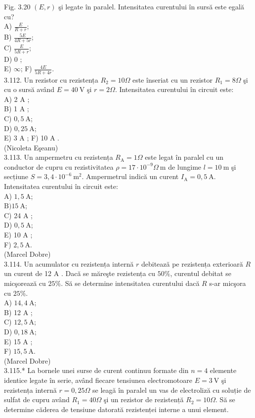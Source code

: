 \documentclass[10pt]{article}
\begin{document}
Fig. 3.20 $(E, r)$ şi legate în paralel. Intensitatea curentului în sursă este egală cu?\\
A) $\frac{E}{R+r}$;\\
B) $\frac{5 E}{4 R+5 r}$;\\
C) $\frac{E}{5 R+r}$;\\
D) 0 ;\\
E) $\infty$; F) $\frac{4 E}{5 R+4 r}$.\\
3.112. Un rezistor cu rezistența $R_{2}=10 \Omega$ este înseriat cu un rezistor $R_{1}=8 \Omega$ şi cu o sursă având $E=40 \mathrm{~V}$ şi $r=2 \Omega$. Intensitatea curentului în circuit este:\\
A) 2 A ;\\
B) 1 A ;\\
C) $0,5 \mathrm{~A}$;\\
D) $0,25 \mathrm{~A}$;\\
E) 3 A ; F) 10 A .\\
(Nicoleta Eşeanu)\\
3.113. Un ampermetru cu rezistența $R_{\mathrm{A}}=1 \Omega$ este legat în paralel cu un conductor de cupru cu rezistivitatea $\rho=17 \cdot 10^{-9} \Omega \mathrm{~m}$ de lungime $l=10 \mathrm{~m}$ şi secțiune $S=3,4 \cdot 10^{-6} \mathrm{~m}^{2}$. Ampermetrul indică un curent $I_{\mathrm{A}}=0,5 \mathrm{~A}$. Intensitatea curentului în circuit este:\\
A) $1,5 \mathrm{~A}$;\\
$\mathrm{B}) 15 \mathrm{~A}$;\\
C) 24 A ;\\
D) $0,5 \mathrm{~A}$;\\
E) 10 A ;\\
F) $2,5 \mathrm{~A}$.\\
(Marcel Dobre)\\
3.114. Un acumulator cu rezistența internă $r$ debitează pe rezistența exterioară $R$ un curent de 12 A . Dacă se măreşte rezistența cu $50 \%$, curentul debitat se micşorează cu $25 \%$. Să se determine intensitatea curentului dacă $R$ s-ar micşora cu $25 \%$.\\
A) $14,4 \mathrm{~A}$;\\
B) 12 A ;\\
C) $12,5 \mathrm{~A}$;\\
D) $0,18 \mathrm{~A}$;\\
E) 15 A ;\\
F) $15,5 \mathrm{~A}$.\\
(Marcel Dobre)\\
3.115.* La bornele unei surse de curent continuu formate din $n=4$ elemente identice legate în serie, având fiecare tensiunea electromotoare $E=3 \mathrm{~V}$ şi rezistența internă $r=0,25 \Omega$ se leagă în paralel un vas de electroliză cu soluție de sulfat de cupru având $R_{1}=40 \Omega$ şi un rezistor de rezistență $R_{2}=10 \Omega$. Să se determine căderea de tensiune datorată rezistenței interne a unui element.\\
\end{document}
